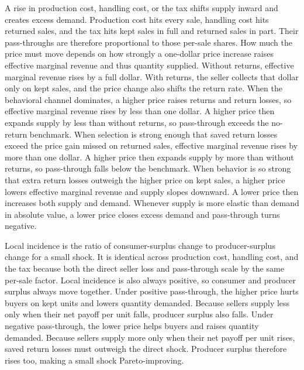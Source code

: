 \documentclass[11pt]{article}
\begin{document}
A rise in production cost, handling cost, or the tax shifts supply inward and
creates excess demand. Production cost hits every sale, handling cost hits
returned sales, and the tax hits kept sales in full and returned sales in
part. Their pass-throughs are therefore proportional to those per-sale shares.
How much the price must move depends on how strongly a one-dollar price
increase raises effective marginal revenue and thus quantity supplied. Without
returns, effective marginal revenue rises by a full dollar. With returns, the
seller collects that dollar only on kept sales, and the price change also
shifts the return rate. When the behavioral channel dominates, a higher price
raises returns and return losses, so effective marginal revenue rises by less
than one dollar. A higher price then expands supply by less than without
returns, so pass-through exceeds the no-return benchmark. When selection is
strong enough that saved return losses exceed the price gain missed on
returned sales, effective marginal revenue rises by more than one dollar. A
higher price then expands supply by more than without returns, so pass-through
falls below the benchmark. When behavior is so strong that extra return losses
outweigh the higher price on kept sales, a higher price lowers effective
marginal revenue and supply slopes downward. A lower price then increases both
supply and demand. Whenever supply is more elastic than demand in
absolute value, a lower price closes excess demand and pass-through turns
negative.

Local incidence is the ratio of consumer-surplus change to producer-surplus
change for a small shock. It is identical across production cost, handling
cost, and the tax because both the direct seller loss and pass-through scale
by the same per-sale factor. Local incidence is also always positive, so
consumer and producer surplus always move together. Under positive
pass-through, the higher price hurts buyers on kept units and lowers quantity
demanded. Because sellers supply less only when their net payoff per unit
falls, producer surplus also falls. Under negative pass-through, the lower
price helps buyers and raises quantity demanded. Because sellers supply more
only when their net payoff per unit rises, saved return losses must outweigh
the direct shock. Producer surplus therefore rises too, making a small shock
Pareto-improving.
\end{document}
